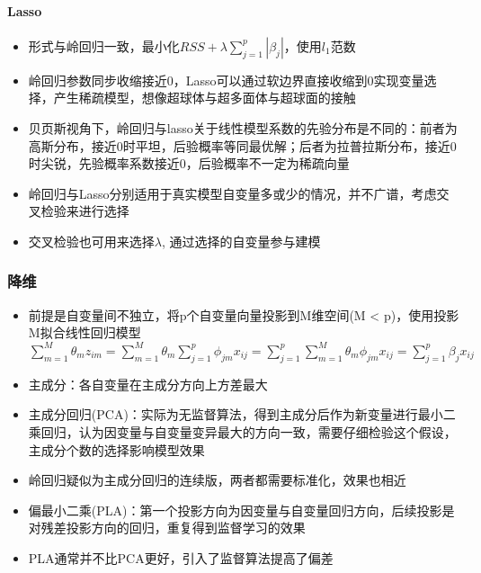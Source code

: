 \documentclass[]{book}
\providecommand{\tightlist}{%
  \setlength{\itemsep}{0pt}\setlength{\parskip}{0pt}}
\let\oldparagraph\paragraph
\renewcommand{\paragraph}[1]{\oldparagraph{#1}\mbox{}}
\begin{document}
\hypertarget{lasso}{%
\paragraph{Lasso}\label{lasso}}

\begin{itemize}
\tightlist
\item
  形式与岭回归一致，最小化\(RSS + \lambda \sum_{j = 1}^{p} |\beta_j|\)，使用\(l_1\)范数
\item
  岭回归参数同步收缩接近0，Lasso可以通过软边界直接收缩到0实现变量选择，产生稀疏模型，想像超球体与超多面体与超球面的接触
\item
  贝页斯视角下，岭回归与lasso关于线性模型系数的先验分布是不同的：前者为高斯分布，接近0时平坦，后验概率等同最优解；后者为拉普拉斯分布，接近0时尖锐，先验概率系数接近0，后验概率不一定为稀疏向量
\item
  岭回归与Lasso分别适用于真实模型自变量多或少的情况，并不广谱，考虑交叉检验来进行选择
\item
  交叉检验也可用来选择\(\lambda\), 通过选择的自变量参与建模
\end{itemize}

\hypertarget{ux964dux7ef4}{%
\subsubsection{降维}\label{ux964dux7ef4}}

\begin{itemize}
\tightlist
\item
  前提是自变量间不独立，将p个自变量向量投影到M维空间(M \textless{} p)，使用投影M拟合线性回归模型 \(\sum_{m = 1}^{M}\theta_m z_{im} = \sum_{m = 1}^{M} \theta_m \sum_{j = 1}^{p} \phi_{jm}x_{ij} = \sum_{j = 1}^p \sum_{m = 1}^{M} \theta_m \phi_{jm} x_{ij} = \sum_{j = 1}^{p} \beta_j x_{ij}\)
\item
  主成分：各自变量在主成分方向上方差最大
\item
  主成分回归(PCA)：实际为无监督算法，得到主成分后作为新变量进行最小二乘回归，认为因变量与自变量变异最大的方向一致，需要仔细检验这个假设，主成分个数的选择影响模型效果
\item
  岭回归疑似为主成分回归的连续版，两者都需要标准化，效果也相近
\item
  偏最小二乘(PLA)：第一个投影方向为因变量与自变量回归方向，后续投影是对残差投影方向的回归，重复得到监督学习的效果
\item
  PLA通常并不比PCA更好，引入了监督算法提高了偏差
\end{itemize}
\end{document}
